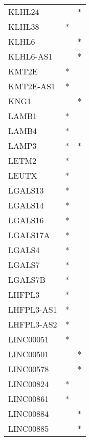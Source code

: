 \begin{longtable}{lcc}
KLHL24           &                &          * \\
KLHL38           &              * &            \\
KLHL6            &                &          * \\
KLHL6-AS1        &                &          * \\
KMT2E            &              * &            \\
KMT2E-AS1        &              * &            \\
KNG1             &                &          * \\
LAMB1            &              * &            \\
LAMB4            &              * &            \\
LAMP3            &              * &          * \\
LETM2            &              * &            \\
LEUTX            &              * &            \\
LGALS13          &              * &            \\
LGALS14          &              * &            \\
LGALS16          &              * &            \\
LGALS17A         &              * &            \\
LGALS4           &              * &            \\
LGALS7           &              * &            \\
LGALS7B          &              * &            \\
LHFPL3           &              * &            \\
LHFPL3-AS1       &              * &            \\
LHFPL3-AS2       &              * &            \\
LINC00051        &              * &            \\
LINC00501        &                &          * \\
LINC00578        &                &          * \\
LINC00824        &              * &            \\
LINC00861        &              * &            \\
LINC00884        &                &          * \\
LINC00885        &                &          * \\

\end{longtable}
